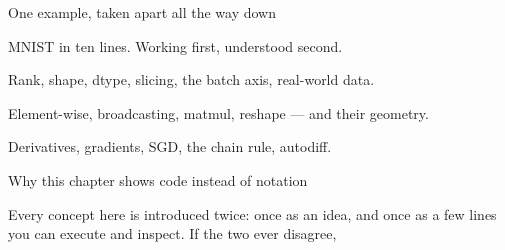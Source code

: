 \documentclass[aspectratio=169,11pt,t]{beamer}
\begin{document}
\begin{frame}[shrink=25]{One example, taken apart all the way down}
\begin{minipage}[t]{0.241\textwidth}
\begin{icard}
MNIST in ten lines. Working first, understood second.
\end{icard}
\end{minipage}%
\hfill
\begin{minipage}[t]{0.241\textwidth}
\begin{icard}
Rank, shape, dtype, slicing, the batch axis, real-world data.
\end{icard}
\end{minipage}%
\hfill
\begin{minipage}[t]{0.241\textwidth}
\begin{icard}
Element-wise, broadcasting, matmul, reshape --- and their geometry.
\end{icard}
\end{minipage}%
\hfill
\begin{minipage}[t]{0.241\textwidth}
\begin{icard}
Derivatives, gradients, SGD, the chain rule, autodiff.
\end{icard}
\end{minipage}%
\end{frame}

\begin{frame}[shrink=25]{Why this chapter shows code instead of notation}
\begin{iquote}
\end{iquote}
{\fontsize{9.4}{12.6}\selectfont\color{fg2}Every concept here is introduced twice: once as an idea, and once as a few lines you can execute and inspect. If the two ever disagree, \par}\vskip 4pt
\end{frame}
\end{document}
